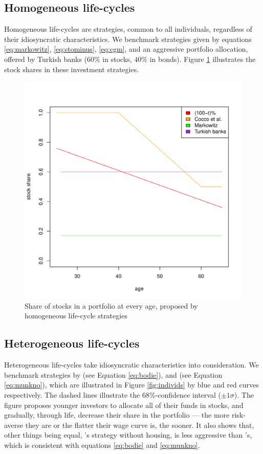 \subsection{Homogeneous life-cycles}

Homogeneous life-cycles are strategies, common to all individuals, regardless of their idiosyncratic characteristics. We benchmark strategies given by equations \ref{eq:markowitz}, \ref{eq:stominus}, \ref{eq:cgm}, and an aggressive portfolio allocation, offered by Turkish banks ($60\%$ in stocks, $40\%$ in bonds). Figure \ref{fig:defaults} illustrates the stock shares in these investment strategies.


\begin{figure}[h!]
	\centering
	\includegraphics[scale=0.4]{figs/defaults.pdf}
	\caption{Share of stocks in a portfolio at every age, proposed by homogeneous life-cycle strategies}
	\label{fig:defaults}
\end{figure}


\subsection{Heterogeneous life-cycles}

Heterogeneous life-cycles take idiosyncratic characteristics into consideration. We benchmark strategies by \citet{bodie} (see Equation \ref{eq:bodie}), and \citet{munk} (see Equation \ref{eq:munkno}), which are illustrated in Figure \ref{fig:individs} by blue and red curves respectively. The dashed lines illustrate the $68\%$-confidence interval ($\pm 1\sigma$). The figure proposes younger investors to allocate all of their funds in stocks, and gradually, through life, decrease their share in the portfolio --- the more risk-averse they are or the flatter their wage curve is, the sooner. It also shows that, other things being equal, \citet{munk}'s strategy without housing, is less aggressive than \citet{bodie}'s, which is consistent with equations \ref{eq:bodie} and \ref{eq:munkno}. 

